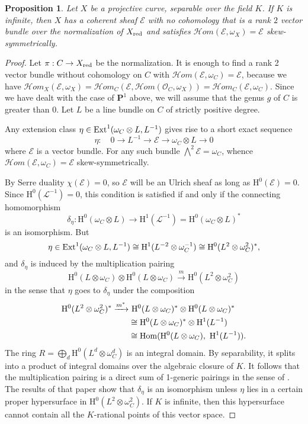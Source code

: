 \documentclass{jams-l}
\newtheorem{proposition}[theorem]{Proposition}
\theoremstyle{definition}
\theoremstyle{remark}
\newcommand{\cE} {{\mathcal E}}
\newcommand{\Hrm}{{\mathrm H}}
\newcommand{\cH}{{\mathcal H}}
\newcommand{\Lcal}{{\mathcal L}}
\newcommand{\Ocal}{{\mathcal O}}
\newcommand{\PP}{{\mathbf P}}
\newcommand{\iso}{\cong}
\newcommand{\Hom}{{\mathop{\rm Hom}\nolimits}}
\newcommand{\extt}{\text{\rm Ext}}
\newcommand{\rTo}{\xrightarrow}
\begin{document}
\begin{proposition}\label{inf field case} Let $X$ be a projective
curve, separable
over the field $K$.
If $K$ is infinite,
then $X$ has a coherent sheaf $\cE$ with no cohomology that
is a rank $2$ vector bundle over
the normalization of $X_{\rm red}$
and satisfies $\cH om(\cE, \omega_X)=\cE$ skew-symmetrically.
\end{proposition}

\begin{proof} Let $\pi: C\to X_{\rm red}$ be the normalization.
It is enough to find a rank 2 vector bundle without cohomology on $C$
with $\cH om(\cE, \omega_C) = \cE$, because we have
$\cH om_X(\cE, \omega_X)
=\cH om_C(\cE,\cH om(\Ocal_C,\omega_X))=\cH om_C(\cE, \omega_C)$. 
Since we have dealt with the case of $\PP^1$ above, we will
assume that the genus $g$ of $C$ is greater than 0.
Let $L$ be a line bundle on $C$ of strictly positive degree.

Any extension class
$\eta
\in \extt^1(\omega_C\otimes L, L^{-1})$ gives rise to a short exact
sequence
\[
\eta:\quad 0\to L^{-1}\to \cE \to \omega_C\otimes L\to 0
\]
where $\cE$ is a vector bundle. For any such bundle 
$\bigwedge^2\cE=\omega_C$, whence $\cH om(\cE, \omega_C)=\cE$
skew-symmetrically.

By Serre duality $\chi(\cE)=0$, so $\cE$ will be an Ulrich
sheaf as long as $\Hrm^0(\cE)=0$. 
Since $\Hrm^0(\Lcal^{-1})=0$,  this condition is satisfied if and only
if the connecting homomorphism 
\[
\delta_\eta: \Hrm^0(\omega_C\otimes L)\to \Hrm^1(\Lcal^{-1})=\Hrm^0(\omega_C\otimes L)^*
\]
is an isomorphism. But 
\[
\eta\in \extt^1(\omega_C\otimes L, L^{-1})\iso \Hrm^1(L^{-2}\otimes\omega_C^{-1})
\iso \Hrm^0(L^2\otimes\omega_C^2)^*,
\]
and $\delta_\eta$ is induced by the multiplication pairing
\[
\Hrm^0(L\otimes\omega_C)\otimes \Hrm^0(L\otimes\omega_C)\rTo{m}
\Hrm^0(L^2\otimes\omega_C^2)
\]
in the sense that $\eta$ goes to $\delta_\eta$ under the composition
\begin{align*}
\Hrm^0(L^2\otimes\omega_C^2)^*\rTo{m^*}
&\,\,\Hrm^0(L\otimes\omega_C)^*\otimes\Hrm^0(L\otimes\omega_C)^*\\
&\iso \Hrm^0(L\otimes\omega_C)^*\otimes\Hrm^1(L^{-1})\\
&\iso \Hom(\Hrm^0(L\otimes\omega_C),\ \Hrm^1(L^{-1})).
\end{align*}
The ring $R=\bigoplus_d\Hrm^0(L^d\otimes\omega_C^d)$
is an integral domain. By separability, it splits
into a product of integral domains over the algebraic
closure of $K$. It follows that the 
multiplication pairing is a direct sum of 1-generic
pairings in the sense of
\cite{Eisenbud 1988}. The results of that paper show that
$\delta_\eta$ is an isomorphism unless $\eta$ lies in
a certain proper hypersurface in $\Hrm^0(L^2\otimes\omega_C^2)$.
If $K$ is infinite, then this hypersurface cannot contain
all the $K$-rational points of this vector space.
\end{proof}
\end{document}
